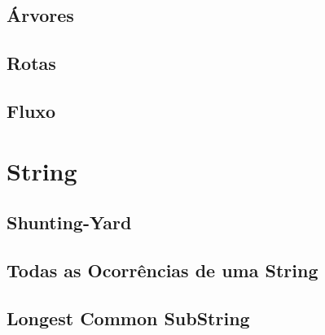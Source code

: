     \section{Árvores}
        
        
        \newpage
    \section{Rotas}
        
        
        
        
        
        \newpage
    \section{Fluxo}
\newpage

\chapter{String}
    \section{Shunting-Yard}
        
        \newpage
    \section{Todas as Ocorrências de uma String}
        
    \section{Longest Common SubString}
        
\newpage


% 

% 


